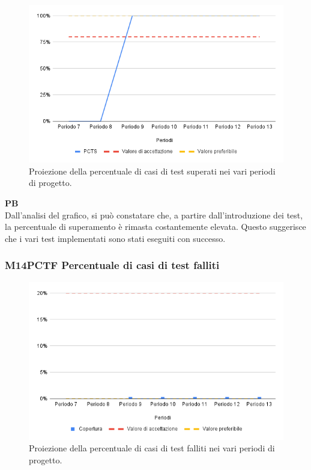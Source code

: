 \begin{figure}[H]
    \centering
    \includegraphics[width=1\textwidth]{../Images/PianoDiQualifica/M13PCTS.png}
    \caption{Proiezione della percentuale di casi di test superati nei vari periodi di progetto.}
    \label{fig:15}
\end{figure}

\textbf{PB} \\
Dall’analisi del grafico, si può constatare che, a partire dall’introduzione dei test, la percentuale di superamento è rimasta costantemente elevata. Questo suggerisce che i vari test implementati sono stati eseguiti con successo.

\vspace{0.2cm}

\subsubsection{M14PCTF Percentuale di casi di test falliti}

\vspace{0.3cm}

\begin{figure}[H]
    \centering
    \includegraphics[width=1\textwidth]{../Images/PianoDiQualifica/M14PCTF.png}
    \caption{Proiezione della percentuale di casi di test falliti nei vari periodi di progetto.}
    \label{fig:16}
\end{figure}

